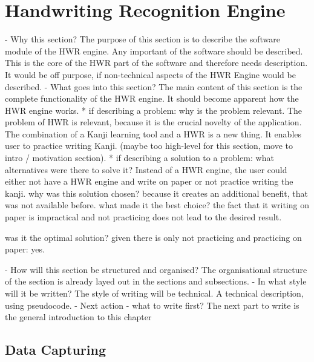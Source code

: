 
\chapter{Handwriting Recognition Engine}
\label{chap:handwritingrecognitionengine}

- Why this section? 
  The purpose of this section is to describe the software module of the 
  HWR engine.
  Any important of the software should be described. This is the core of the
  HWR part of the software and therefore needs description.
  It would be off purpose, if non-technical aspects of the HWR Engine would be 
  described.
- What goes into this section?
  The main content of this section is the complete functionality of the 
  HWR engine.
  It should become apparent how the HWR engine works.
  * if describing a problem: why is the problem relevant.
    The problem of HWR is relevant, because it is the crucial novelty of the
    application. The combination of a Kanji learning tool and a HWR is a new 
    thing. It enables user to practice writing Kanji. (maybe too high-level for
    this section, move to intro / motivation section).
  * if describing a solution to a problem: 
    what alternatives were there to solve it?    
    Instead of a HWR engine, the user could either not have a HWR engine and
    write on paper or not practice writing the kanji.
    why was this solution chosen? 
    because it creates an additional benefit, that was not available before.
    what made it the best choice? 
    the fact that it writing on paper is impractical and not practicing does
    not lead to the desired result.

    was it the optimal solution? given there is only not practicing and
    practicing on paper: yes.

- How will this section be structured and organised?
  The organisational structure of the section is already layed out in the
  sections and subsections.
- In what style will it be written?
  The style of writing will be technical. A technical description, using
  pseudocode.
- Next action - what to write first?
  The next part to write is the general introduction to this chapter


\section{Data Capturing}
\label{sec:hwre:datacapturing}

